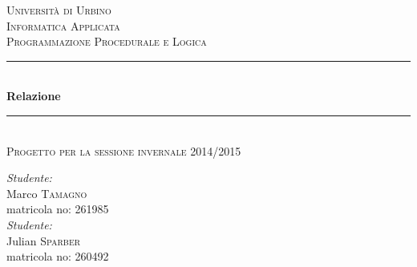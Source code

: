 ﻿\documentclass[11pt, a4paper, titlepage, block]{article}
\begin{document}
	\begin{titlepage}

		\newcommand{\HRule}{\rule{\linewidth}{0.5mm}} %

		\center %


		\textsc{\LARGE Universit\`a di Urbino}\\[1.5cm] %
		\textsc{\Large Informatica Applicata}\\[0.5cm] %
		\textsc{\large Programmazione Procedurale e Logica}\\[0.5cm] %



		\HRule \\[0.4cm]
		{ \huge \bfseries Relazione}\\[0.2cm] %
		\HRule \\[0.4cm]
		\textsc{\large Progetto per la sessione invernale 2014/2015}
		\\[2cm]

		\begin{minipage}{\textwidth}
			\begin{flushleft}
				\emph{Studente:}\\
				Marco \textsc{Tamagno}\\ %
				matricola no: 261985
				\\[1cm]
				\emph{Studente:}\\
				Julian \textsc{Sparber}\\ %
				matricola no: 260492\\
			\end{flushleft}
		\end{minipage}\\[3cm]


\end{titlepage}
\end{document}
